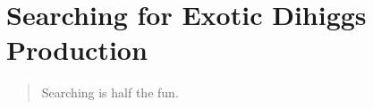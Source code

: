 \chapter{Searching for Exotic Dihiggs Production}
\label{sec:dihiggs}
\begin{quote}
Searching is half the fun. \\
\end{quote}








%




